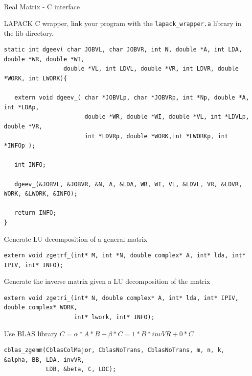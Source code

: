 \documentclass[xcolor=x11names,compress]{beamer}
\renewcommand{\(}{\begin{columns}}
\renewcommand{\)}{\end{columns}}
\newcommand{\<}[1]{\begin{column}{#1}}
\renewcommand{\>}{\end{column}}
\begin{document}
\subsection{}
\begin{frame}[fragile]{Real Matrix - C interface}
\begin{tiny}
LAPACK C wrapper, link your program with the \verb+lapack_wrapper.a+ library in the lib directory. 
\begin{verbatim}
static int dgeev( char JOBVL, char JOBVR, int N, double *A, int LDA, double *WR, double *WI,
                 double *VL, int LDVL, double *VR, int LDVR, double *WORK, int LWORK){

   extern void dgeev_( char *JOBVLp, char *JOBVRp, int *Np, double *A, int *LDAp, 
                       double *WR, double *WI, double *VL, int *LDVLp, double *VR, 
                       int *LDVRp, double *WORK,int *LWORKp, int *INFOp );

   int INFO;

   dgeev_(&JOBVL, &JOBVR, &N, A, &LDA, WR, WI, VL, &LDVL, VR, &LDVR, WORK, &LWORK, &INFO);

   return INFO;
}
\end{verbatim}
Generate LU decomposition of a general matrix
\begin{verbatim}
extern void zgetrf_(int* M, int *N, double complex* A, int* lda, int* IPIV, int* INFO);
\end{verbatim}
Generate the inverse matrix given a LU decomposition of the matrix
\begin{verbatim}
extern void zgetri_(int* N, double complex* A, int* lda, int* IPIV, double complex* WORK, 
                    int* lwork, int* INFO);
\end{verbatim}
Use BLAS library  $C =  \alpha*A*B + \beta*C = 1*B*invVR + 0*C$
\begin{verbatim}
cblas_zgemm(CblasColMajor, CblasNoTrans, CblasNoTrans, m, n, k, &alpha, BB, LDA, invVR,
            LDB, &beta, C, LDC);
\end{verbatim}
\end{tiny}
\end{frame}
\end{document}
